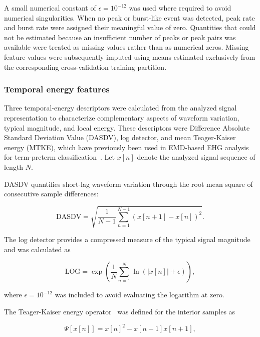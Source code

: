 \documentclass[10pt,letterpaper]{article}
\begin{document}
A small numerical constant of $\epsilon=10^{-12}$ was used where required to avoid numerical singularities. When no peak or burst-like event was detected, peak rate and burst rate were assigned their meaningful value of zero. Quantities that could not be estimated because an insufficient number of peaks or peak pairs was available were treated as missing values rather than as numerical zeros. Missing feature values were subsequently imputed using means estimated exclusively from the corresponding cross-validation training partition.

\subsubsection*{Temporal energy features}

Three temporal-energy descriptors were calculated from the analyzed signal representation to characterize complementary aspects of waveform variation, typical magnitude, and local energy. These descriptors were Difference Absolute Standard Deviation Value (DASDV), log detector, and mean Teager-Kaiser energy (MTKE), which have previously been used in EMD-based EHG analysis for term-preterm classification~\cite{janjarasjitt2021preterm,janjarasjitt2022comparison,mohammadifar2022prediction,mohammadifar2023prediction}. Let $x[n]$ denote the analyzed signal sequence of length $N$.

DASDV quantifies short-lag waveform variation through the root mean square of consecutive sample differences:

\begin{equation}
\mathrm{DASDV}
=
\sqrt{
\frac{1}{N-1}
\sum_{n=1}^{N-1}
\left(x[n+1]-x[n]\right)^2
}.
\end{equation}

The log detector provides a compressed measure of the typical signal magnitude and was calculated as

\begin{equation}
\mathrm{LOG}
=
\exp\left(
\frac{1}{N}
\sum_{n=1}^{N}
\ln\left(|x[n]|+\epsilon\right)
\right),
\end{equation}

where $\epsilon=10^{-12}$ was included to avoid evaluating the logarithm at zero.

The Teager-Kaiser energy operator~\cite{Kaiser1990} was defined for the interior samples as

\begin{equation}
\Psi[x[n]]
=
x[n]^2-x[n-1]x[n+1],
\end{equation}
\end{document}
